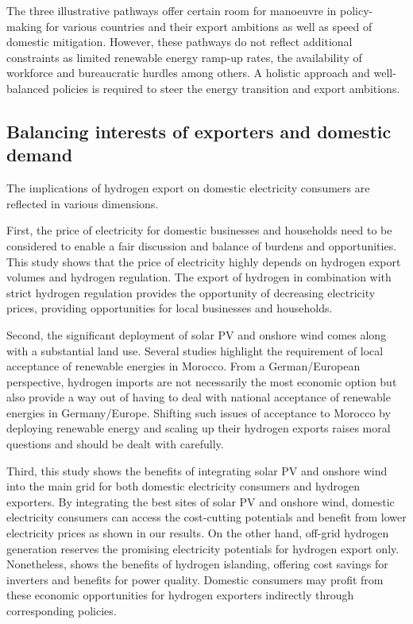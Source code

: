 The three illustrative pathways offer certain room for manoeuvre in policy-making for various countries and their export ambitions as well as speed of domestic mitigation. However, these pathways do not reflect additional constraints as limited renewable energy ramp-up rates, the availability of workforce and bureaucratic hurdles among others. A holistic approach and well-balanced policies is required to steer the energy transition and export ambitions.




\subsection*{Balancing interests of exporters and domestic demand}
\label{subsec:balancedinterests}
The implications of hydrogen export on domestic electricity consumers are reflected in various dimensions. 

First, the price of electricity for domestic businesses and households need to be considered to enable a fair discussion and balance of burdens and opportunities. This study shows that the price of electricity highly depends on hydrogen export volumes and hydrogen regulation. The export of hydrogen in combination with strict hydrogen regulation provides the opportunity of decreasing electricity prices, providing opportunities for local businesses and households.

Second, the significant deployment of solar PV and onshore wind comes along with a substantial land use. Several studies \cite{Terrapon-Pfaff2019, Hanger2016} highlight the requirement of local acceptance of renewable energies in Morocco. From a German/European perspective, hydrogen imports are not necessarily the most economic option \cite{Merten2023} but also provide a way out of having to deal with national acceptance of renewable energies in Germany/Europe.
Shifting such issues of acceptance to Morocco by deploying renewable energy and scaling up their hydrogen exports raises moral questions and should be dealt with carefully. %

Third, this study shows the benefits of integrating solar PV and onshore wind into the main grid for both domestic electricity consumers and hydrogen exporters. By integrating the best sites of solar PV and onshore wind, domestic electricity consumers can access the cost-cutting potentials and benefit from lower electricity prices as shown in our results. On the other hand, off-grid hydrogen generation reserves the promising electricity potentials for hydrogen export only. Nonetheless, \cite{Tries2023b} shows the benefits of hydrogen islanding, offering cost savings for inverters and benefits for power quality. Domestic consumers may profit from these economic opportunities for hydrogen exporters indirectly through corresponding policies.

